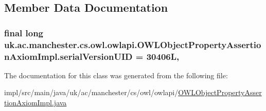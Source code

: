 \subsection{Member Data Documentation}
\hypertarget{classuk_1_1ac_1_1manchester_1_1cs_1_1owl_1_1owlapi_1_1_o_w_l_object_property_assertion_axiom_impl_a2717746fc18979ac7c4e1b263c5a64f4}{
\subsubsection[{serial\-Version\-U\-I\-D}]{\setlength{\rightskip}{0pt plus 5cm}final long uk.\-ac.\-manchester.\-cs.\-owl.\-owlapi.\-O\-W\-L\-Object\-Property\-Assertion\-Axiom\-Impl.\-serial\-Version\-U\-I\-D = 30406\-L\hspace{0.3cm}{\ttfamily [static]}, {\ttfamily [private]}}}\label{classuk_1_1ac_1_1manchester_1_1cs_1_1owl_1_1owlapi_1_1_o_w_l_object_property_assertion_axiom_impl_a2717746fc18979ac7c4e1b263c5a64f4}


The documentation for this class was generated from the following file\-:\begin{DoxyCompactItemize}
\item 
impl/src/main/java/uk/ac/manchester/cs/owl/owlapi/\hyperlink{_o_w_l_object_property_assertion_axiom_impl_8java}{O\-W\-L\-Object\-Property\-Assertion\-Axiom\-Impl.\-java}\end{DoxyCompactItemize}

